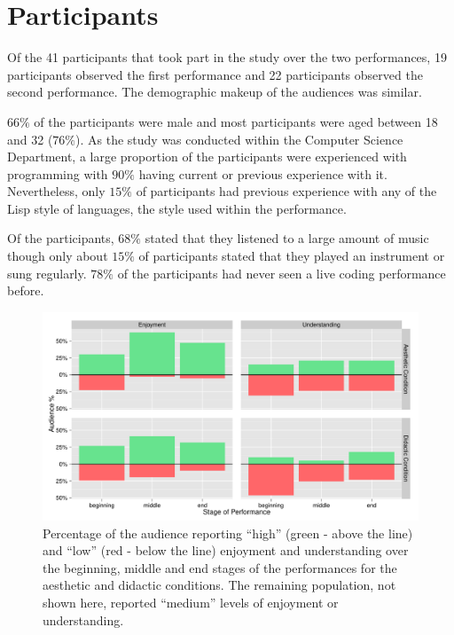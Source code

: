 \section{Participants}

Of the 41 participants that took part in the study over the two performances, 19 participants observed the first performance and 22 participants observed the second performance. The demographic makeup of the audiences was similar.

$66\%$ of the participants were male and most participants were aged between 18 and 32 ($76\%$). As the study was conducted within the Computer Science Department, a large proportion of the participants were experienced with programming with $90\%$ having current or previous experience with it. Nevertheless, only $15\%$ of participants had previous experience with any of the Lisp style of languages, the style used within the performance.

Of the participants, $68\%$ stated that they listened to a large amount of music though only about $15\%$ of participants stated that they played an instrument or sung regularly. $78\%$ of the participants had never seen a live coding performance before.

\begin{figure}
  \centering
  \includegraphics[width=\columnwidth]{../study-2/results/graphs/dimension-condition.pdf}
  \caption[User study survey condition and dimension results]{Percentage of the audience reporting ``high'' (green - above
the line) and ``low'' (red - below the line) enjoyment and
understanding over the beginning, middle and end stages of the
performances for the aesthetic and didactic conditions. The remaining
population, not shown here, reported ``medium'' levels of enjoyment or
understanding.}
  \label{fig:dimension-condition}
\end{figure}

